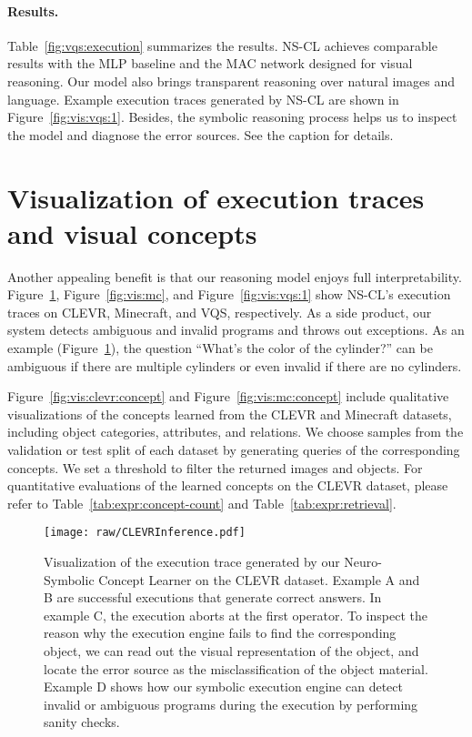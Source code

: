 \documentclass{article} \usepackage{iclr2019_conference,times}
\newcommand{\model}{NS-CL\xspace}
\begin{document}
{\paragraph{Results. }
Table~\ref{fig:vqs:execution} summarizes the results. \model achieves comparable results with the MLP baseline and the MAC network designed for visual reasoning. Our model also brings transparent reasoning over natural images and language. Example execution traces generated by \model are shown in Figure~\ref{fig:vis:vqs:1}. Besides, the symbolic reasoning process helps us to inspect the model and diagnose the error sources. See the caption for details. 

\section{Visualization of execution traces and visual concepts}
\label{sec:app:concept}

Another appealing benefit is that our reasoning model enjoys full interpretability. Figure~\ref{fig:visualization}, Figure~\ref{fig:vis:mc}, and Figure~\ref{fig:vis:vqs:1} show \model's execution traces on CLEVR, Minecraft, and VQS, respectively. As a side product, our system detects ambiguous and invalid programs and throws out exceptions. As an example (Figure~\ref{fig:visualization}), the question ``What's the color of the cylinder?'' can be ambiguous if there are multiple cylinders or even invalid if there are no cylinders.

Figure~\ref{fig:vis:clevr:concept} and Figure~\ref{fig:vis:mc:concept} include qualitative visualizations of the concepts learned from the CLEVR and Minecraft datasets, including object categories, attributes, and relations. We choose samples from the validation or test split of each dataset by generating queries of the corresponding concepts. We set a threshold to filter the returned images and objects. For quantitative evaluations of the learned concepts on the CLEVR dataset, please refer to Table~\ref{tab:expr:concept-count} and Table~\ref{tab:expr:retrieval}.

\begin{figure}[ht]
\centering
\texttt{[image: raw/CLEVRInference.pdf]}
\caption{Visualization of the execution trace generated by our Neuro-Symbolic Concept Learner on the CLEVR dataset. Example A and B are successful executions that generate correct answers. In example C, the execution aborts at the first operator. To inspect the reason why the execution engine fails to find the corresponding object, we can read out the visual representation of the object, and locate the error source as the misclassification of the object material. Example D shows how our symbolic execution engine can detect invalid or ambiguous programs during the execution by performing sanity checks.}
\label{fig:visualization}
\end{figure}

}
\end{document}
